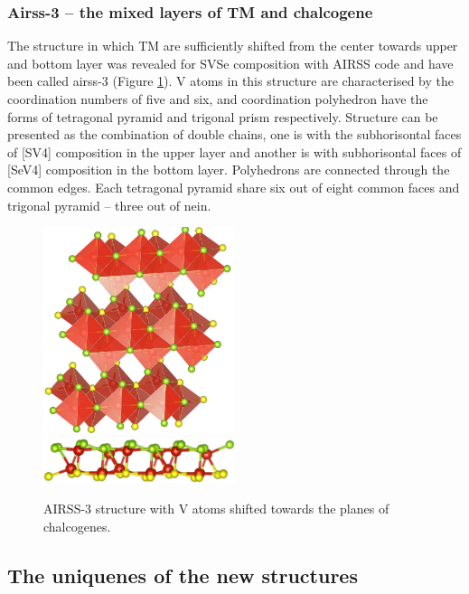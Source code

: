 \documentclass[a4paperm]{article}
\begin{document}
\subsubsection{ Airss-3 – the mixed layers of TM and chalcogene}

The structure in which TM are sufficiently shifted from the center towards upper and bottom layer was revealed for SVSe composition with AIRSS code and have been called airss-3 (Figure \ref{airss-3}).
V atoms in this structure are characterised by the coordination numbers of five and six, and coordination polyhedron have the forms of tetragonal pyramid and trigonal prism respectively.
Structure can be presented as the combination of double chains, one is with the subhorisontal faces of [SV4] composition in the upper layer and another is with subhorisontal faces of [SeV4] composition in the bottom layer.
Polyhedrons are connected through the common edges.
Each tetragonal pyramid share six out of eight common faces and trigonal pyramid – three out of nein.

\begin{figure}[H]
        \includegraphics[width=0.5\textwidth]{airss-3-1.jpg} \\ \vspace{3mm}
        \includegraphics[width=0.5\textwidth]{airss-3-2.jpg}
        \caption{AIRSS-3 structure with V atoms shifted towards the planes of chalcogenes.}
\label{airss-3}
\end{figure}


\subsection{The uniquenes of the new structures}
\end{document}
